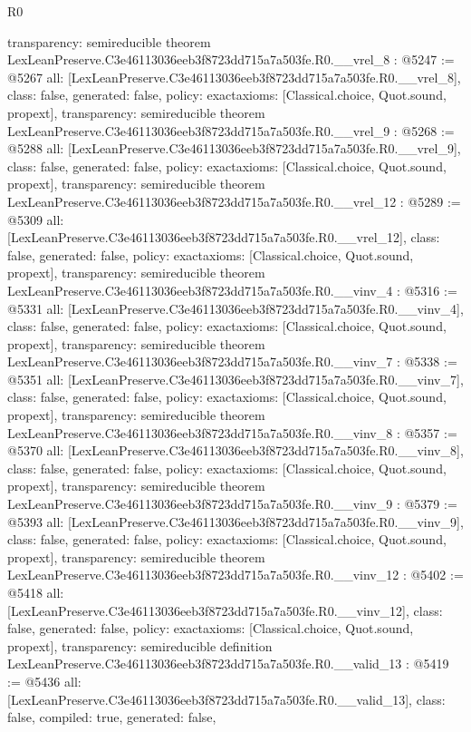 \begin{lexlean}{R0}
\begin{coremodule}
{  transparency: semireducible
}
theorem LexLeanPreserve.C3e46113036eeb3f8723dd715a7a503fe.R0.__vrel_8 : @5247 := @5267 {
  all: [LexLeanPreserve.C3e46113036eeb3f8723dd715a7a503fe.R0.__vrel_8],
  class: false,
  generated: false,
  policy: exact{axioms: [Classical.choice, Quot.sound, propext]},
  transparency: semireducible
}
theorem LexLeanPreserve.C3e46113036eeb3f8723dd715a7a503fe.R0.__vrel_9 : @5268 := @5288 {
  all: [LexLeanPreserve.C3e46113036eeb3f8723dd715a7a503fe.R0.__vrel_9],
  class: false,
  generated: false,
  policy: exact{axioms: [Classical.choice, Quot.sound, propext]},
  transparency: semireducible
}
theorem LexLeanPreserve.C3e46113036eeb3f8723dd715a7a503fe.R0.__vrel_12 : @5289 := @5309 {
  all: [LexLeanPreserve.C3e46113036eeb3f8723dd715a7a503fe.R0.__vrel_12],
  class: false,
  generated: false,
  policy: exact{axioms: [Classical.choice, Quot.sound, propext]},
  transparency: semireducible
}
theorem LexLeanPreserve.C3e46113036eeb3f8723dd715a7a503fe.R0.__vinv_4 : @5316 := @5331 {
  all: [LexLeanPreserve.C3e46113036eeb3f8723dd715a7a503fe.R0.__vinv_4],
  class: false,
  generated: false,
  policy: exact{axioms: [Classical.choice, Quot.sound, propext]},
  transparency: semireducible
}
theorem LexLeanPreserve.C3e46113036eeb3f8723dd715a7a503fe.R0.__vinv_7 : @5338 := @5351 {
  all: [LexLeanPreserve.C3e46113036eeb3f8723dd715a7a503fe.R0.__vinv_7],
  class: false,
  generated: false,
  policy: exact{axioms: [Classical.choice, Quot.sound, propext]},
  transparency: semireducible
}
theorem LexLeanPreserve.C3e46113036eeb3f8723dd715a7a503fe.R0.__vinv_8 : @5357 := @5370 {
  all: [LexLeanPreserve.C3e46113036eeb3f8723dd715a7a503fe.R0.__vinv_8],
  class: false,
  generated: false,
  policy: exact{axioms: [Classical.choice, Quot.sound, propext]},
  transparency: semireducible
}
theorem LexLeanPreserve.C3e46113036eeb3f8723dd715a7a503fe.R0.__vinv_9 : @5379 := @5393 {
  all: [LexLeanPreserve.C3e46113036eeb3f8723dd715a7a503fe.R0.__vinv_9],
  class: false,
  generated: false,
  policy: exact{axioms: [Classical.choice, Quot.sound, propext]},
  transparency: semireducible
}
theorem LexLeanPreserve.C3e46113036eeb3f8723dd715a7a503fe.R0.__vinv_12 : @5402 := @5418 {
  all: [LexLeanPreserve.C3e46113036eeb3f8723dd715a7a503fe.R0.__vinv_12],
  class: false,
  generated: false,
  policy: exact{axioms: [Classical.choice, Quot.sound, propext]},
  transparency: semireducible
}
definition LexLeanPreserve.C3e46113036eeb3f8723dd715a7a503fe.R0.__valid_13 : @5419 := @5436 {
  all: [LexLeanPreserve.C3e46113036eeb3f8723dd715a7a503fe.R0.__valid_13],
  class: false,
  compiled: true,
  generated: false,
}
\end{coremodule}
\end{lexlean}

